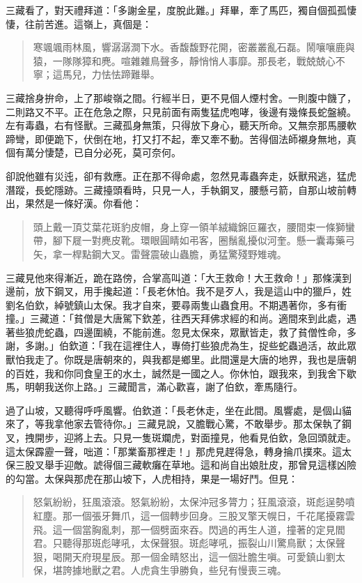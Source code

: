 三藏看了，對天禮拜道：「多謝金星，度脫此難。」拜畢，牽了馬匹，獨自個孤孤悽悽，往前苦進。這嶺上，真個是：
\begin{quote}
寒颯颯雨林風，響潺潺澗下水。香馥馥野花開，密叢叢亂石磊。鬧嚷嚷鹿與猿，一隊隊獐和麂。喧雜雜鳥聲多，靜悄悄人事靡。那長老，戰兢兢心不寧；這馬兒，力怯怯蹄難舉。
\end{quote}

三藏捨身拚命，上了那峻嶺之間。行經半日，更不見個人煙村舍。一則腹中饑了，二則路又不平。正在危急之際，只見前面有兩隻猛虎咆哮，後邊有幾條長蛇盤繞。左有毒蟲，右有怪獸。三藏孤身無策，只得放下身心，聽天所命。又無奈那馬腰軟蹄彎，即便跪下，伏倒在地，打又打不起，牽又牽不動。苦得個法師襯身無地，真個有萬分悽楚，已自分必死，莫可奈何。

卻說他雖有災迍，卻有救應。正在那不得命處，忽然見毒蟲奔走，妖獸飛逃，猛虎潛蹤，長蛇隱跡。三藏擡頭看時，只見一人，手執鋼叉，腰懸弓箭，自那山坡前轉出，果然是一條好漢。你看他：
\begin{quote}
頭上戴一頂艾葉花斑豹皮帽，身上穿一領羊絨織錦叵羅衣，腰間束一條獅蠻帶，腳下屣一對麂皮靴。環眼圓睛如弔客，圈鬚亂擾似河奎。懸一囊毒藥弓矢，拿一桿點鋼大叉。雷聲震破山蟲膽，勇猛驚殘野雉魂。
\end{quote}

三藏見他來得漸近，跪在路傍，合掌高叫道：「大王救命！大王救命！」那條漢到邊前，放下鋼叉，用手攙起道：「長老休怕。我不是歹人，我是這山中的獵戶，姓劉名伯欽，綽號鎮山太保。我才自來，要尋兩隻山蟲食用。不期遇著你，多有衝撞。」三藏道：「貧僧是大唐駕下欽差，往西天拜佛求經的和尚。適間來到此處，遇著些狼虎蛇蟲，四邊圍繞，不能前進。忽見太保來，眾獸皆走，救了貧僧性命，多謝，多謝。」伯欽道：「我在這裡住人，專倚打些狼虎為生，捉些蛇蟲過活，故此眾獸怕我走了。你既是唐朝來的，與我都是鄉里。此間還是大唐的地界，我也是唐朝的百姓，我和你同食皇王的水土，誠然是一國之人。你休怕，跟我來，到我舍下歇馬，明朝我送你上路。」三藏聞言，滿心歡喜，謝了伯欽，牽馬隨行。

過了山坡，又聽得呼呼風響。伯欽道：「長老休走，坐在此間。風響處，是個山貓來了，等我拿他家去管待你。」三藏見說，又膽戰心驚，不敢舉步。那太保執了鋼叉，拽開步，迎將上去。只見一隻斑斕虎，對面撞見，他看見伯欽，急回頭就走。這太保霹靂一聲，咄道：「那業畜那裡走！」那虎見趕得急，轉身掄爪撲來。這太保三股叉舉手迎敵。諕得個三藏軟癱在草地。這和尚自出娘肚皮，那曾見這樣凶險的勾當。太保與那虎在那山坡下，人虎相持，果是一場好鬥。但見：
\begin{quote}
怒氣紛紛，狂風滾滾。怒氣紛紛，太保沖冠多膂力；狂風滾滾，斑彪逞勢噴紅塵。那一個張牙舞爪，這一個轉步回身。三股叉擎天幌日，千花尾擾霧雲飛。這一個當胸亂刺，那一個劈面來吞。閃過的再生人道，撞著的定見閻君。只聽得那斑彪哮吼，太保聲狠。斑彪哮吼，振裂山川驚鳥獸；太保聲狠，喝開天府現星辰。那一個金睛怒出，這一個壯膽生嗔。可愛鎮山劉太保，堪誇據地獸之君。人虎貪生爭勝負，些兒有慢喪三魂。
\end{quote}

